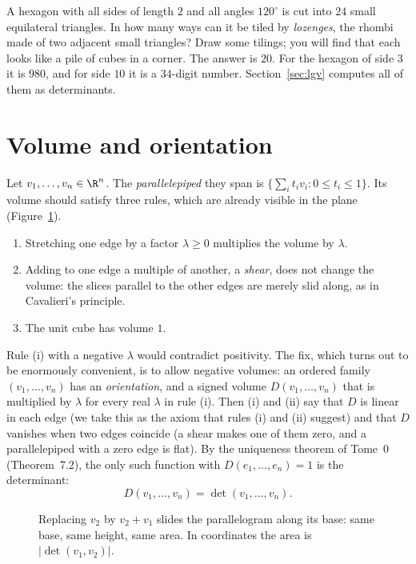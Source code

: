 \begin{think}
A hexagon with all sides of length $2$ and all angles $120^\circ$ is cut into $24$ small equilateral triangles. In how
many ways can it be tiled by \emph{lozenges}, the rhombi made of two adjacent small triangles? Draw some tilings; you
will find that each looks like a pile of cubes in a corner. The answer is $20$. For the hexagon of side $3$ it is $980$,
and for side $10$ it is a $34$-digit number. Section~\ref{sec:lgv} computes all of them as determinants.
\end{think}

\section{Volume and orientation}

Let $v_1,\dots,v_n\in\R^n$. The \emph{parallelepiped} they span is $\{\sum_it_iv_i:0\le t_i\le1\}$. Its volume should
satisfy three rules, which are already visible in the plane (Figure~\ref{fig:shear}).
\begin{enumerate}[label=(\roman*)]
\item Stretching one edge by a factor $\lambda\ge0$ multiplies the volume by $\lambda$.
\item Adding to one edge a multiple of another, a \emph{shear}, does not change the volume: the slices parallel to the
other edges are merely slid along, as in Cavalieri's principle.
\item The unit cube has volume $1$.
\end{enumerate}
Rule (i) with a negative $\lambda$ would contradict positivity. The fix, which turns out to be enormously convenient, is
to allow negative volumes: an ordered family $(v_1,\dots,v_n)$ has an \emph{orientation}, and a signed volume
$D(v_1,\dots,v_n)$ that is multiplied by $\lambda$ for every real $\lambda$ in rule (i). Then (i) and (ii) say that $D$
is linear in each edge (we take this as the axiom that rules (i) and (ii) suggest) and that $D$ vanishes when two
edges coincide (a shear makes one of them zero, and a
parallelepiped with a zero edge is flat). By the uniqueness theorem of Tome~0 (Theorem~7.2), the only such function with
$D(e_1,\dots,e_n)=1$ is the determinant:
\[
D(v_1,\dots,v_n)=\det(v_1,\dots,v_n).
\]

\begin{figure}[ht]
\centering
{}
\caption{Replacing $v_2$ by $v_2+v_1$ slides the parallelogram along its base: same base, same height, same area. In
coordinates the area is $|\det(v_1,v_2)|$.}
\label{fig:shear}
\end{figure}

